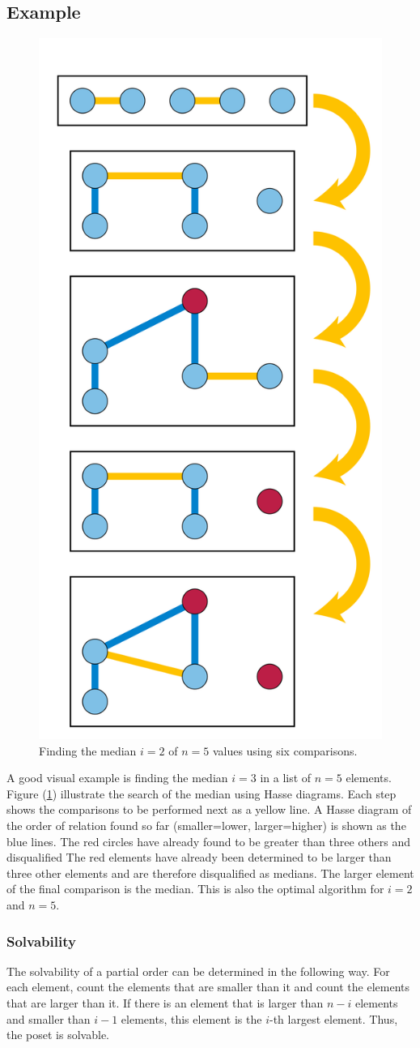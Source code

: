 \documentclass[10pt,journal,compsoc]{IEEEtran}
\begin{document}
\subsection{Example}
\begin{figure}[h!]
  \centering
  \includegraphics[width=0.5\columnwidth]{figures/Median_of_5.svg.png}
  \caption{Finding the median $i=2$ of $n=5$ values using six comparisons.}
  \label{fig:median_of_5}
\end{figure}
A good visual example is finding the median $i=3$ in a list of $n=5$ elements. Figure
(\ref{fig:median_of_5}) illustrate the search of the median using Hasse diagrams. Each step shows
the comparisons to be performed next as a yellow line. A Hasse diagram of the order of relation
found so far (smaller=lower, larger=higher) is shown as the blue lines. The red circles have already
found to be greater than three others and disqualified The red elements have already been determined
to be larger than three other elements and are therefore disqualified as medians. The larger
element of the final comparison is the median. This is also the optimal algorithm for $i=2$ and
$n=5$.


\subsubsection{Solvability}
The solvability of a partial order can be determined in the following way. For each element, count
the elements that are smaller than it and count the elements that are larger than it. If there is an
element that is larger than $n-i$ elements and smaller than $i-1$ elements, this element is the
$i$-th largest element. Thus, the poset is solvable.
\end{document}
